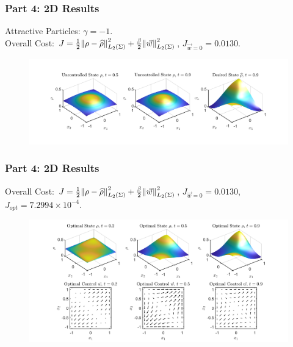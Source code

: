 \documentclass[aspectratio=169,xcolor=dvipsnames]{beamer}
\begin{document}
\begin{frame}
	\frametitle{Part 4: 2D Results}
    Attractive Particles: $\gamma = -1$.\\
	Overall Cost: $J = \frac{1}{2}\norm{\rho- \widehat{\rho}}_{L_2(\Sigma)}^2 + \frac{\beta}{2} \norm{\vec{w}}_{L_2(\Sigma)}^2$, $J_{\vec{w}=0} = 0.0130$.

	\begin{figure}
		\includegraphics[width=15cm]{Res1Ex2.png}
	\end{figure}
	
\end{frame}

\begin{frame}
	\frametitle{Part 4: 2D Results}
	\vspace{0.3cm}
	Overall Cost: $J = \frac{1}{2}\norm{\rho- \widehat{\rho}}_{L_2(\Sigma)}^2 + \frac{\beta}{2} \norm{\vec{w}}_{L_2(\Sigma)}^2$, $J_{\vec{w}=0} = 0.0130$, $J_{opt} = 7.2994 \times 10^{-4}$.
	\begin{figure}
		\includegraphics[width=14cm]{Res2Ex2.png}
	\end{figure}
\end{frame}
\end{document}
